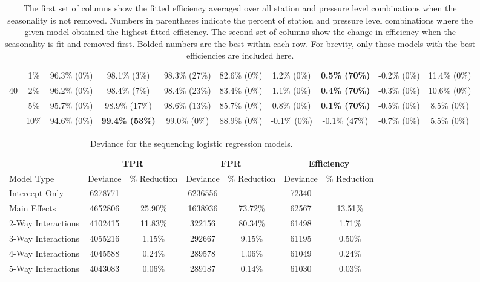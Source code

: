\documentclass[12pt]{article}
\begin{document}
\begin{landscape}
\begin{table}[ht]
\begin{footnotesize}
\begin{tabular}{cc|cccc|cccc}
		 & 1\% & 96.3\% (0\%) & 98.1\% (3\%) & 98.3\% (27\%) & 82.6\% (0\%) & 1.2\% (0\%) & \textbf{0.5\% (70\%)} & -0.2\% (0\%) & 11.4\% (0\%) \\ 
		 40 & 2\% & 96.2\% (0\%) & 98.4\% (7\%) & 98.4\% (23\%) & 83.4\% (0\%) & 1.1\% (0\%) & \textbf{0.4\% (70\%)} & -0.3\% (0\%) & 10.6\% (0\%) \\ 
		 & 5\% & 95.7\% (0\%) & 98.9\% (17\%) & 98.6\% (13\%) & 85.7\% (0\%) & 0.8\% (0\%) & \textbf{0.1\% (70\%)} & -0.5\% (0\%) & 8.5\% (0\%) \\ 
		 & 10\% & 94.6\% (0\%) & \textbf{99.4\% (53\%)} & 99.0\% (0\%) & 88.9\% (0\%) & -0.1\% (0\%) & -0.1\% (47\%) & -0.7\% (0\%) & 5.5\% (0\%) \\ 
		\hline
	\end{tabular}
\caption{The first set of columns show the fitted efficiency averaged over all station and pressure level combinations when the seasonality is not removed.  Numbers in parentheses indicate the percent of station and pressure level combinations where the given model obtained the highest fitted efficiency.  The second set of columns show the change in efficiency when the seasonality is fit and removed first.    Bolded numbers are the best within each row.  For brevity, only those models with the best efficiencies are included here.  }
\label{tab:homOrd}
\end{footnotesize}
\end{table}

\end{landscape}

\begin{table}[ht]
\centering
\begin{tabular}{l|cc|cc|cc}
  \hline
	& \multicolumn{2}{c|}{\textbf{TPR}} & \multicolumn{2}{c|}{\textbf{FPR}} & \multicolumn{2}{c}{\textbf{Efficiency}}\\
	Model Type & Deviance & \% Reduction & Deviance & \% Reduction & Deviance & \% Reduction\\
  \hline
	Intercept Only & 6278771 & --- & 6236556 & --- & 72340 & ---\\
	Main Effects  & 4652806 & 25.90\% & 1638936 & 73.72\% & 62567 & 13.51\%\\
	2-Way Interactions  & 4102415 & 11.83\% & 322156 & 80.34\% & 61498 & 1.71\%\\
	3-Way Interactions  & 4055216 & 1.15\% & 292667 & 9.15\% & 61195 & 0.50\%\\
	4-Way Interactions  & 4045588 & 0.24\% & 289578 & 1.06\% & 61049 & 0.24\%\\
	5-Way Interactions  & 4043083 & 0.06\% & 289187 & 0.14\% & 61030 & 0.03\%\\
   \hline
\end{tabular}
\caption{Deviance for the sequencing logistic regression models.}
\label{tab:devSeq}
\end{table}
\end{document}
